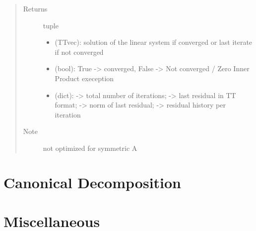 \documentclass[a4paper,10pt,english]{sphinxmanual}
\begin{document}
\begin{fulllineitems}
\begin{quote}
\begin{description}
\item[{Returns}] \leavevmode

tuple 
\begin{itemize}
\item {} 
 (TTvec): solution of the linear system if converged or last iterate if not converged

\item {} 
 (bool): True -\textgreater{} converged, False -\textgreater{} Not converged / Zero Inner Product exeception

\item {} 
 (dict):  -\textgreater{} total number of iterations;  -\textgreater{} last residual in TT format;  -\textgreater{} norm of last residual;  -\textgreater{} residual history per iteration

\end{itemize}


\item[{Note}] \leavevmode
not optimized for symmetric A

\end{description}\end{quote}

\end{fulllineitems}



\section{Canonical Decomposition}
\label{api-candecomp:canonical-decomposition}\label{api-candecomp::doc}\label{api-candecomp:module-TensorToolbox}

\begin{fulllineitems}
\label{api-candecomp:TensorToolbox.core.Candecomp}
\end{fulllineitems}



\section{Miscellaneous}
\label{api-core:module-TensorToolbox.core}\label{api-core::doc}\label{api-core:miscellaneous}
\end{document}
